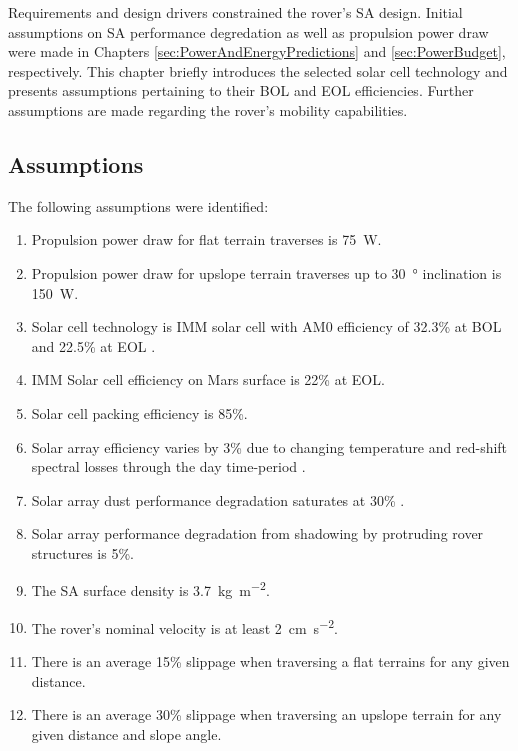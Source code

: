 Requirements and design drivers constrained the rover's \ac{SA} design. Initial assumptions on \ac{SA} performance degredation as well as propulsion power draw were made in Chapters \ref{sec:PowerAndEnergyPredictions} and \ref{sec:PowerBudget}, respectively. This chapter briefly introduces the selected solar cell technology and presents assumptions pertaining to their \ac{BOL} and \ac{EOL} efficiencies. Further assumptions are made regarding the rover's mobility capabilities.


\subsection{Assumptions}
\label{sec:RequirementsAndDesignDrivers:Assumptions}
The following assumptions were identified:

\begin{enumerate}[label=\textbf{\textcolor{BulletBlue}{A-\arabic*}}]
    \item Propulsion power draw for flat terrain traverses is \SI{75}{\watt}.
    \item Propulsion power draw for upslope terrain traverses up to \SI{30}{\degree} inclination is \SI{150}{\watt}.
    \item Solar cell technology is \ac{IMM} solar cell with AM0 efficiency of 32.3\% at \ac{BOL} and 22.5\% at \ac{EOL} .
    \item \label{itm:ass:solar_cell_efficiency} \ac{IMM} Solar cell efficiency on Mars surface is 22\% at \ac{EOL}.
    \item \label{itm:ass:packing_efficiency} Solar cell packing efficiency is 85\%.
    \item \label{itm:ass:red_shifts} Solar array efficiency varies by 3\% due to changing temperature and red-shift spectral losses through the day time-period .
    \item \label{itm:ass:dust_deposition_saturation} Solar array dust performance degradation saturates at 30\% .
    \item \label{itm:ass:protruding_shadowing} Solar array performance degradation from shadowing by protruding rover structures is 5\%.
    \item \label{itm:ass:sa_surface_density} The \ac{SA} surface density is \SI{3.7}{kg.m^{-2}}.
    \item The rover's nominal velocity is at least \SI{2}{cm.s^{-2}}.
    \item There is an average 15\% slippage when traversing a flat terrains for any given distance.
    \item There is an average 30\% slippage when traversing an upslope terrain for any given distance and slope angle.
\end{enumerate}

